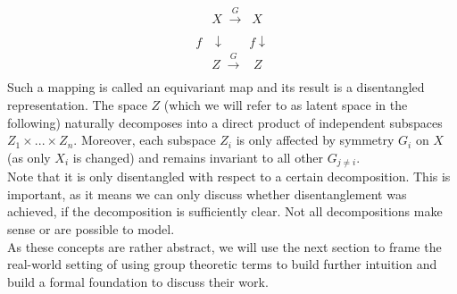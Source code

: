 \documentclass{article} %
\begin{document}
\begin{align*}
&X \;\xrightarrow[\text{}]{G}\;\;X\\ 
f&\downarrow \;\;\;\;\;\;\;f\downarrow\\
&Z \;\xrightarrow[\text{}]{G}\;\;\;Z
\end{align*}
Such a mapping is called an equivariant map and its result is a disentangled representation. The space $Z$ (which we will refer to as latent space in the following) naturally decomposes into a direct product of independent subspaces $Z_1 \times ... \times Z_n$. Moreover, each subspace $Z_i$ is only affected by symmetry $G_i$ on $X$ (as only $X_i$ is changed) and remains invariant to all other $G_{j \neq i}$.\\
Note that it is only disentangled with respect to a certain decomposition. This is important, as it means we can only discuss whether disentanglement was achieved, if the decomposition is sufficiently clear. Not all decompositions make sense or are possible to model.\\
As these concepts are rather abstract, we will use the next section to frame the real-world setting of \citet{hsu2017unsupervised} using group theoretic terms to build further intuition and build a formal foundation to discuss their work.
\end{document}
